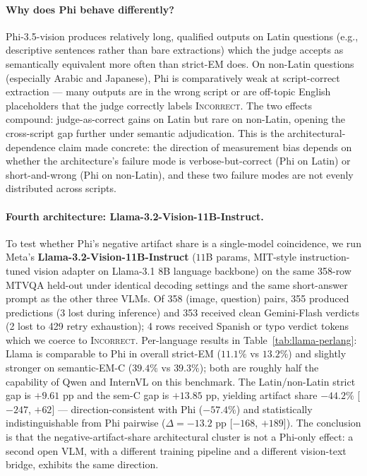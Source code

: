 \paragraph{Why does Phi behave differently?}
Phi-3.5-vision produces relatively long, qualified outputs on Latin questions (e.g., descriptive sentences rather than bare extractions) which the judge accepts as semantically equivalent more often than strict-EM does. On non-Latin questions (especially Arabic and Japanese), Phi is comparatively weak at script-correct extraction --- many outputs are in the wrong script or are off-topic English placeholders that the judge correctly labels \textsc{Incorrect}. The two effects compound: judge-as-correct gains on Latin but rare on non-Latin, opening the cross-script gap further under semantic adjudication. This is the architectural-dependence claim made concrete: the direction of measurement bias depends on whether the architecture's failure mode is verbose-but-correct (Phi on Latin) or short-and-wrong (Phi on non-Latin), and these two failure modes are not evenly distributed across scripts.

\paragraph{Fourth architecture: Llama-3.2-Vision-11B-Instruct.}
To test whether Phi's negative artifact share is a single-model coincidence, we run Meta's \textbf{Llama-3.2-Vision-11B-Instruct} ($11$B params, MIT-style instruction-tuned vision adapter on Llama-3.1 8B language backbone) on the same 358-row MTVQA held-out under identical decoding settings and the same short-answer prompt as the other three VLMs. Of 358 (image, question) pairs, 355 produced predictions (3 lost during inference) and 353 received clean Gemini-Flash verdicts (2 lost to 429 retry exhaustion); 4 rows received Spanish or typo verdict tokens which we coerce to \textsc{Incorrect}. Per-language results in Table~\ref{tab:llama-perlang}: Llama is comparable to Phi in overall strict-EM ($11.1\%$ vs $13.2\%$) and slightly stronger on semantic-EM-C ($39.4\%$ vs $39.3\%$); both are roughly half the capability of Qwen and InternVL on this benchmark. The Latin/non-Latin strict gap is $+9.61$ pp and the sem-C gap is $+13.85$ pp, yielding artifact share $-44.2\%$ [$-247$, $+62$] --- direction-consistent with Phi ($-57.4\%$) and statistically indistinguishable from Phi pairwise ($\Delta = -13.2$ pp [$-168$, $+189$]). The conclusion is that the negative-artifact-share architectural cluster is not a Phi-only effect: a second open VLM, with a different training pipeline and a different vision-text bridge, exhibits the same direction.

